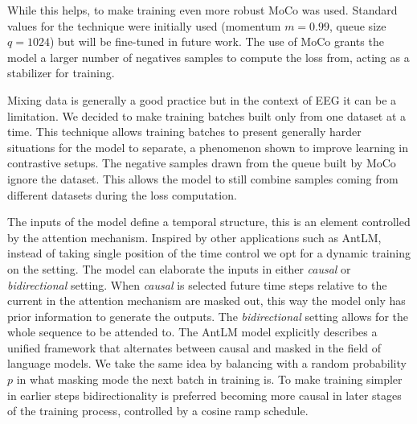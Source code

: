 While this helps, to make training even more robust MoCo was used.
Standard values for the technique were initially used (momentum $m=0.99$, queue size $q=1024$) but will be fine-tuned in future work.
The use of MoCo grants the model a larger number of negatives samples to compute the loss from, acting as a stabilizer for training.

Mixing data is generally a good practice but in the context of EEG it can be a limitation.
We decided to make training batches built only from one dataset at a time.
This technique allows training batches to present generally harder situations for the model to separate, a phenomenon shown to improve learning in contrastive setups.
The negative samples drawn from the queue built by MoCo ignore the dataset.
This allows the model to still combine samples coming from different datasets during the loss computation.

The inputs of the model define a temporal structure, this is an element controlled by the attention mechanism.
Inspired by other applications such as AntLM\cite{yu2024antlmbridgingcausalmasked}, instead of taking single position of the time control we opt for a dynamic training on the setting.
The model can elaborate the inputs in either \textit{causal} or \textit{bidirectional} setting.
When \textit{causal} is selected future time steps relative to the current in the attention mechanism are masked out,
this way the model only has prior information to generate the outputs.
The \textit{bidirectional} setting allows for the whole sequence to be attended to.
The AntLM model explicitly describes a unified framework that alternates between causal and masked in the field of language models.
We take the same idea by balancing with a random probability $p$ in what masking mode the next batch in training is.
To make training simpler in earlier steps bidirectionality is preferred becoming more causal in later stages of the training process,
controlled by a cosine ramp schedule.
